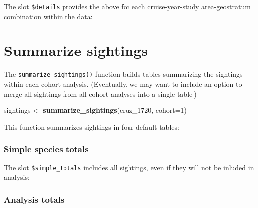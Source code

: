 \documentclass[
]{book}
\newenvironment{Shaded}{\begin{snugshade}}{\end{snugshade}}
\newcommand{\DataTypeTok}[1]{\textcolor[rgb]{0.13,0.29,0.53}{#1}}
\newcommand{\DecValTok}[1]{\textcolor[rgb]{0.00,0.00,0.81}{#1}}
\newcommand{\KeywordTok}[1]{\textcolor[rgb]{0.13,0.29,0.53}{\textbf{#1}}}
\newcommand{\NormalTok}[1]{#1}
\newcommand{\OperatorTok}[1]{\textcolor[rgb]{0.81,0.36,0.00}{\textbf{#1}}}
\newcommand{\StringTok}[1]{\textcolor[rgb]{0.31,0.60,0.02}{#1}}
\begin{document}
The slot \texttt{\$details} provides the above for each cruise-year-study area-geostratum combination within the data:

\hypertarget{summarize-sightings}{%
\section*{Summarize sightings}\label{summarize-sightings}}

The \texttt{summarize\_sightings()} function builds tables summarizing the sightings within each cohort-analysis. (Eventually, we may want to include an option to merge all sightings from all cohort-analyses into a single table.)

\begin{Shaded}
\begin{Highlighting}[]
\NormalTok{sightings <-}\StringTok{ }\KeywordTok{summarize_sightings}\NormalTok{(cruz_}\DecValTok{1720}\NormalTok{,}
                                 \DataTypeTok{cohort=}\DecValTok{1}\NormalTok{)}
\end{Highlighting}
\end{Shaded}

This function summarizes sightings in four default tables:

\begin{Shaded}
\end{Shaded}

\hypertarget{simple-species-totals}{%
\subsubsection*{Simple species totals}\label{simple-species-totals}}

The slot \texttt{\$simple\_totals} includes all sightings, even if they will not be inluded in analysis:

\hypertarget{analysis-totals}{%
\subsubsection*{Analysis totals}\label{analysis-totals}}
\end{document}
